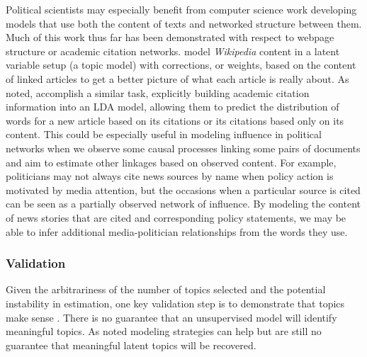 \documentclass{article}
\begin{document}
Political scientists may especially benefit from computer science work developing models that use both the content of texts and networked structure between them. Much of this work thus far has been demonstrated with respect to webpage structure or academic citation networks. \citet{Neiswanger2014} model \textit{Wikipedia} content in a latent variable setup (a topic model) with corrections, or weights, based on the content of linked articles to get a better picture of what each article is really about.  As noted, \citet{Chang2009} accomplish a similar task, explicitly building academic citation information into an LDA model, allowing them to predict the distribution of words for a new article based on its citations or its citations based only on its content. This could be especially useful in modeling influence in political networks when we observe some causal processes linking some pairs of documents and aim to estimate other linkages based on observed content. For example, politicians may not always cite news sources by name when policy action is motivated by media attention, but the occasions when a particular source is cited can be seen as a partially observed network of influence. By modeling the content of news stories that are cited and corresponding policy statements, we may be able to infer additional media-politician relationships from the words they use.






\subsubsection{Validation}
Given the arbitrariness of the number of topics selected and the potential instability in estimation, one key validation step is to demonstrate that topics make sense \citep{Grimmer2013}. There is no guarantee that an unsupervised model will identify meaningful topics. As noted modeling strategies can help but are still no guarantee that meaningful latent topics will be recovered. 
\end{document}
